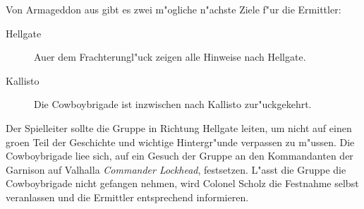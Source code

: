 
Von Armageddon aus gibt es zwei m"ogliche n"achste Ziele f"ur die Ermittler:

\begin{description}
	\item [Hellgate] Au\3er dem Frachterungl"uck zeigen alle Hinweise nach Hellgate.
	\item [Kallisto] Die Cowboybrigade ist inzwischen nach Kallisto zur"uckgekehrt.
\end{description}

Der Spielleiter sollte die Gruppe in Richtung Hellgate leiten, um nicht auf einen gro\3en Teil der Geschichte und wichtige Hintergr"unde verpassen zu m"ussen. Die Cowboybrigade lie\3e sich, auf ein Gesuch der Gruppe an den Kommandanten der Garnison auf Valhalla \textit{Commander Lockhead}, festsetzen. L"asst die Gruppe die Cowboybrigade nicht gefangen nehmen, wird Colonel Scholz die Festnahme selbst veranlassen und die Ermittler entsprechend informieren.

